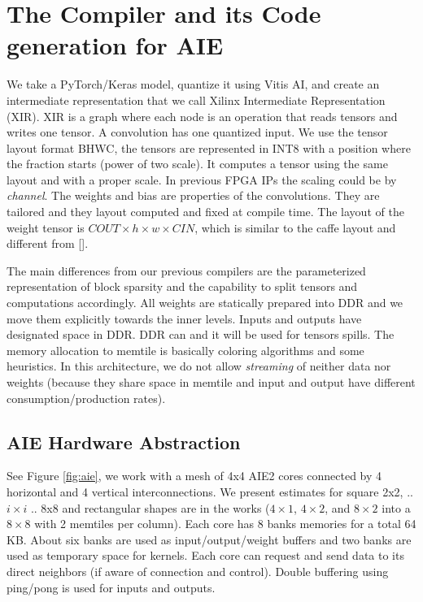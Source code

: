 \documentclass{IEEEtran}
\begin{document}
\section{The Compiler and its Code generation for AIE}
\label{sec:compiler}
We take a PyTorch/Keras model, quantize it using Vitis AI, and create
an intermediate representation that we call Xilinx Intermediate
Representation (XIR). XIR is a graph where each node is an operation
that reads tensors and writes one tensor.  A convolution has one
quantized input.  We use the tensor layout format BHWC, the tensors
are represented in INT8 with a position where the fraction starts
(power of two scale). It computes a tensor using the same layout and
with a proper scale. In previous FPGA IPs the scaling could be by {\em
  channel}. The weights and bias are properties of the
convolutions. They are tailored and they layout computed and fixed at
compile time.  The layout of the weight tensor is $COUT\times h \times
w \times CIN$, which is similar to the caffe layout \cite{Caffe} and
different from \cite{tensorflow2015-whitepaper} []. 


The main differences from our previous compilers are the parameterized
representation of block sparsity and the capability to split tensors
and computations accordingly. All weights are statically prepared into
DDR and we move them explicitly towards the inner levels. Inputs and
outputs have designated space in DDR. DDR can and it will be used for
tensors spills.  The memory allocation to memtile is basically
coloring algorithms and some heuristics. In this architecture, we do
not allow {\em streaming} of neither data nor weights (because they
share space in memtile and input and output have different
consumption/production rates).

\subsection{AIE Hardware Abstraction}


See Figure \ref{fig:aie}, we work with a mesh of 4x4 AIE2 cores
connected by 4 horizontal and 4 vertical interconnections.  We present
estimates for square 2x2, .. $i\times i$ .. 8x8 and rectangular shapes
are in the works ($4\times 1$, $4 \times 2$, and $8\times 2$ into a $8
\times 8$ with 2 memtiles per column). Each core has 8 banks memories
for a total 64 KB. About six banks are used as input/output/weight
buffers and two banks are used as temporary space for kernels. Each
core can request and send data to its direct neighbors (if aware of
connection and control). Double buffering using ping/pong is used for
inputs and outputs.
\end{document}
